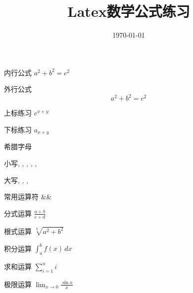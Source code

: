 \documentclass[UTF8]{article}
\title{Latex数学公式练习}
\date{\today}
\begin{document}
\maketitle

内行公式  $a^2+b^2=c^2$


外行公式  $$a^2+b^2=c^2$$

上标练习 $e^{x+y}$

下标练习 $a_{x+y}$

希腊字母 

小写\alpha, \beta, \gamma, \delta, \pi, \omega

大写\Gamma, \Delta, \Pi, \Omega

常用运算符
&\times \div \pm \mp \cdot \leq \geq \neq \approx \equiv \infty \partial \nabla \forall \exists \in \subset \cup \cap&

分式运算
$\frac{a+b}{c+d}$

根式运算
$\sqrt[3]{a^2+b^2}$

积分运算
$\int_a^b f(x) \,dx$

求和运算
$\sum_{i=1}^n i$

极限运算
$\lim_{x \to 0} \frac{\sin x}{x}$
\end{document}
